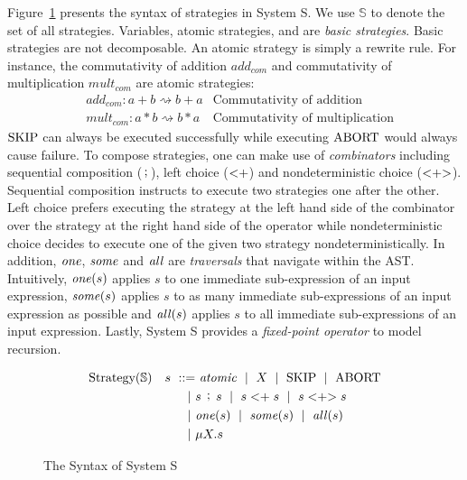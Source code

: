 Figure~\ref{chap4:syntax:syntax} presents the syntax of strategies in System S. We use $\mathbb{S}$ to denote the set of all strategies. Variables, atomic strategies, \sskip and \sabort are \textit{basic strategies}. Basic strategies are not decomposable. An atomic strategy is simply a rewrite rule. For instance, the commutativity of addition $\mathit{add_{com}}$ and commutativity of multiplication $\mathit{mult_{com}}$ are atomic strategies:
\begin{align*}
    &\mathit{add_{com}}: a + b \rightsquigarrow b + a &\text{Commutativity of addition}\\
    &\mathit{mult_{com}}: a * b \rightsquigarrow b * a &\text{Commutativity of multiplication}
\end{align*}
$\text{SKIP}$ can always be executed successfully while executing $\text{ABORT}$ would always cause failure. To compose strategies, one can make use of \textit{combinators} including sequential composition ($\, \mathrel{\mathop;} \,$), left choice ($<\mathrel{\mathop+}$) and nondeterministic choice ($<\mathrel{\mathop+}\mathrel{\mathop>}$). Sequential composition instructs to execute two strategies one after the other. Left choice prefers executing the strategy at the left hand side of the combinator over the strategy at the right hand side of the operator while nondeterministic choice decides to execute one of the given two strategy nondeterministically. In addition, $\text{\textit{one}\/}$, $\text{\textit{some}\/}$ and $\text{\textit{all}\/}$ are \textit{traversals} that navigate within the AST. Intuitively, $\text{\textit{one}\/}(s)$ applies $s$ to one immediate sub-expression of an input expression, $\text{\textit{some}\/}(s)$ applies $s$ to as many immediate sub-expressions of an input expression as possible and   $\text{\textit{all}\/}(s)$ applies $s$ to all immediate sub-expressions of an input expression. Lastly, System S provides a \textit{fixed-point operator} to model recursion.
\begin{figure}
\begin{alignat*}{3}
    \text{Strategy}(\mathbb{S}) \quad
    s \ \mathrel{\mathop{::}}= &\ \mathit{atomic}
    \ \mid \  X \ \mid \  \text{SKIP} \ \mid \  \text{ABORT}
    \\ \ \mid \  &s\, \mathrel{\mathop;} \, s
    \ \mid \  s <\mathrel{\mathop+} s
    \ \mid \  s <\mathrel{\mathop+}\mathrel{\mathop>} s
    \\ \ \mid \  &\text{\textit{one}\/}(s)
    \ \mid \  \text{\textit{some}\/}(s)
    \ \mid \  \text{\textit{all}\/}(s)
    \\ \ \mid \  &\mu X. s
\end{alignat*}
\caption{The Syntax of System S}
\label{chap4:syntax:syntax}
\end{figure}
